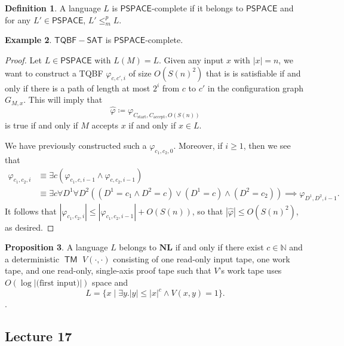 \documentclass[10pt,letterpaper,cm]{nupset}
\theoremstyle{definition}
\newtheorem{definition}{Definition}[subsection]
\newtheorem{exmp}[definition]{Example}
\theoremstyle{theorem}
\newtheorem{prop}[definition]{Proposition}
\theoremstyle{remark}
\newcommand{\N}{\mathbb N}
\newcommand{\1}{\mathbf{1}}
\newcommand{\0}{\vec 0}
\DeclareMathOperator{\TM}{\mathsf{TM}}
\begin{document}
\begin{definition}
A language $L$ is $\mathsf{PSPACE}$-complete if it belongs to $\mathsf{PSPACE}$ and for any $L' \in \mathsf{PSPACE}$, $L' \leq_m^p L$.
\end{definition}

\begin{exmp}
$\mathsf{TQBF{-}SAT} $ is $\mathsf{PSPACE}$-complete.
\end{exmp}
\begin{proof}
Let $L \in \mathsf{PSPACE}$ with $L(M) = L$. Given any input $x$ with $|x| =n$, we want to construct a TQBF $\varphi_{c, c', i}$ of size $O(S(n)^2)$ that is is satisfiable if and only if there is a path of length at most $2^i$ from $c$ to $c'$ in the configuration graph $G_{M,x}$. This will imply that $$\hat{\varphi}\coloneqq \varphi_{C_{\text{start}}, C_{\text{accept}}, O(S(n))}$$ is true if and only if $M$ accepts $x$ if and only if $x\in L$.

\medskip

 We have previously constructed such a $\varphi_{c_1, c_2, 0}$. Moreover, if $i\geq 1$, then we see that 
\begin{align*}
\varphi_{c_1, c_2, i} & \equiv \exists c(\varphi_{c_1, c, i-1} \land \varphi_{c, c_2, i-1})
\\ & \equiv \exists c \forall D^1 \forall D^2((D^1 = c_1 \land D^2 = c) \vee (D^1 = c) \land (D^2 = c_2)) \implies \varphi_{D^1, D^2, i-1}.
\end{align*}
It follows that $|\varphi_{c_1, c_2, i}|\leq |\varphi_{c_1, c_2, i-1}| +O(S(n))$, so that $|\hat{\varphi}| \leq O(S(n)^2)$, as desired.
\end{proof}

\begin{prop}
A language $L$ belongs to $\mathbf{NL}$ if and only if there exist $c\in \N$ and a deterministic $\TM$ $V(\cdot, \cdot)$ consisting of one read-only input tape, one work tape, and one read-only, single-axis proof tape  such that $V$'s work tape uses $O(\log{|\text{(first input)}|})$ space and $$L = \{ x \mid \exists y.|y| \leq |x|^{c} \land V(x,y) = 1\}.$$ .
\end{prop}

\subsection{Lecture 17}
\end{document}
